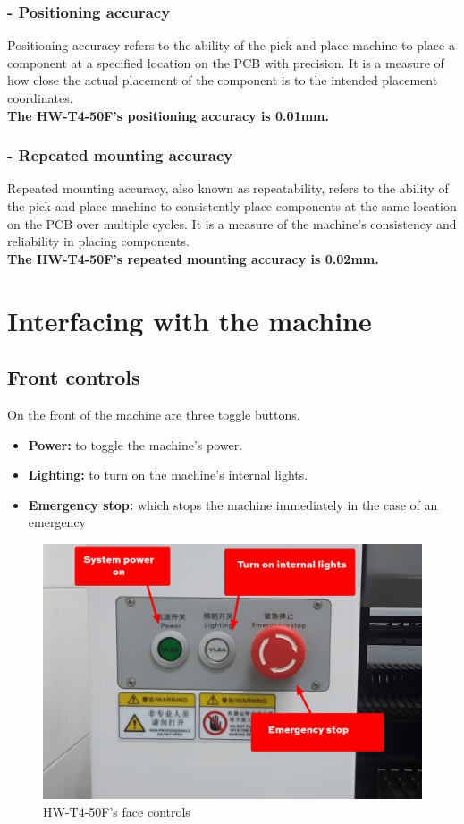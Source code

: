 \documentclass[a4paper,10pt]{report}
\begin{document}
\subsubsection{- Positioning accuracy}
Positioning accuracy refers to the ability of the pick-and-place machine to place a component at a specified location on the PCB with precision. It is a measure of how close the actual placement of the component is to the intended placement coordinates.\\ \textbf{The HW-T4-50F's positioning accuracy is 0.01mm.}
\subsubsection{- Repeated mounting accuracy}
Repeated mounting accuracy, also known as repeatability, refers to the ability of the pick-and-place machine to consistently place components at the same location on the PCB over multiple cycles. It is a measure of the machine's consistency and reliability in placing components.\\ \textbf{The HW-T4-50F's  repeated mounting accuracy is 0.02mm.}
\newpage
\section{Interfacing with the machine}
\subsection{Front controls}
On the front of the machine are three toggle buttons.
\begin{itemize}
 \item \textbf{Power: } to toggle the machine's power.
 \item \textbf{Lighting: } to turn on the machine's internal lights.
 \item \textbf{Emergency stop: } which stops the machine immediately in the case of an emergency
\end{itemize}
 \begin{figure}[!htb]
 \centering
 \includegraphics[width=1\textwidth]{face_panel.png}
 \caption{HW-T4-50F's face controls}
\end{figure}
\newpage
\end{document}
